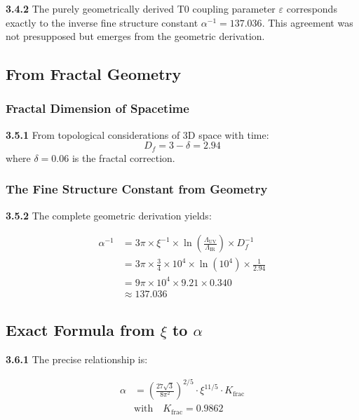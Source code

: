 \documentclass[12pt,a4paper]{article}
\newcommand{\xipar}{\xi}
\begin{document}
	\begin{tcolorbox}[colback=blue!5!white,colframe=blue!75!black,title=Remarkable Agreement]
		\textbf{3.4.2} The purely geometrically derived T0 coupling parameter $\varepsilon$ corresponds exactly to the inverse fine structure constant $\alpha^{-1} = 137.036$. This agreement was not presupposed but emerges from the geometric derivation.
	\end{tcolorbox}
	
	\subsection{From Fractal Geometry}
	
	\subsubsection{Fractal Dimension of Spacetime}
	
	\noindent \textbf{3.5.1} From topological considerations of 3D space with time:
	\begin{equation}
		D_f = 3 - \delta = 2.94
	\end{equation}
	where $\delta = 0.06$ is the fractal correction.
	
	\subsubsection{The Fine Structure Constant from Geometry}
	
	\noindent \textbf{3.5.2} The complete geometric derivation yields:
	\begin{keyresult}
		\begin{align}
			\alpha^{-1} &= 3\pi \times \xipar^{-1} \times \ln\left(\frac{\Lambda_{\text{UV}}}{\Lambda_{\text{IR}}}\right) \times D_f^{-1} \\
			&= 3\pi \times \frac{3}{4} \times 10^{4} \times \ln(10^{4}) \times \frac{1}{2.94} \\
			&= 9\pi \times 10^{4} \times 9.21 \times 0.340 \\
			&\approx 137.036
		\end{align}
	\end{keyresult}
	
	\subsection{Exact Formula from $\xipar$ to $\alpha$}
	
	\noindent \textbf{3.6.1} The precise relationship is:
	\begin{keyresult}
		\begin{align}
			\alpha &= \left( \frac{27 \sqrt{3}}{8 \pi^2} \right)^{2/5} \cdot \xipar^{11/5} \cdot K_{\text{frac}} \\
			&\text{with} \quad K_{\text{frac}} = 0.9862
		\end{align}
	\end{keyresult}
	
\end{document}
